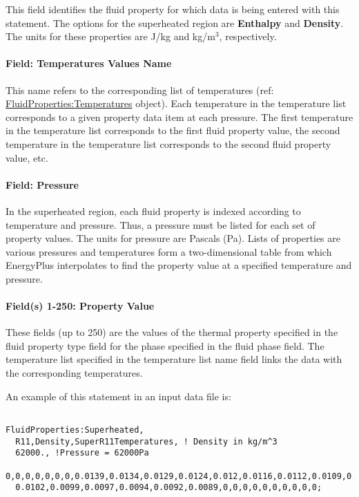 This field identifies the fluid property for which data is being entered with this statement. The options for the superheated region are \textbf{Enthalpy} and \textbf{Density}. The units for these properties are J/kg and kg/m\(^{3}\), respectively.

\paragraph{Field: Temperatures Values Name}\label{field-temperatures-values-name-1}

This name refers to the corresponding list of temperatures (ref: \hyperref[fluidpropertiestemperatures]{FluidProperties:Temperatures} object). Each temperature in the temperature list corresponds to a given property data item at each pressure. The first temperature in the temperature list corresponds to the first fluid property value, the second temperature in the temperature list corresponds to the second fluid property value, etc.

\paragraph{Field: Pressure}\label{field-pressure}

In the superheated region, each fluid property is indexed according to temperature and pressure. Thus, a pressure must be listed for each set of property values. The units for pressure are Pascals (Pa). Lists of properties are various pressures and temperatures form a two-dimensional table from which EnergyPlus interpolates to find the property value at a specified temperature and pressure.

\paragraph{Field(s) 1-250: Property Value}\label{fields-1-250-property-value-1}

These fields (up to 250) are the values of the thermal property specified in the fluid property type field for the phase specified in the fluid phase field. The temperature list specified in the temperature list name field links the data with the corresponding temperatures.

An example of this statement in an input data file is:

\begin{lstlisting}

FluidProperties:Superheated,
  R11,Density,SuperR11Temperatures, ! Density in kg/m^3
  62000., !Pressure = 62000Pa
  0,0,0,0,0,0,0,0.0139,0.0134,0.0129,0.0124,0.012,0.0116,0.0112,0.0109,0.0105,
  0.0102,0.0099,0.0097,0.0094,0.0092,0.0089,0,0,0,0,0,0,0,0,0,0;
\end{lstlisting}

